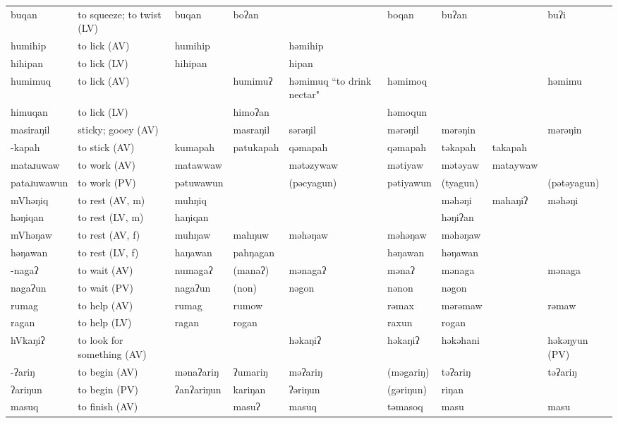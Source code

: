 \begin{landscape}
\begin{longtable}{*{9}{p{}}}
\text{*}buqan & to squeeze; to twist (LV) & buqan & boʔan &  & boqan & buʔan &  & buʔi\\
\text{*}humihip & to lick (AV) & humihip &  & həmihip &  &  &  & \\
\text{*}hihipan & to lick (LV) & hihipan &  & hipan &  &  &  & \\
\text{*}humimuq & to lick (AV) &  & humimuʔ & həmimuq ``to drink nectar" & həmimoq &  &  & həmimu\\
\text{*}himuqan & to lick (LV) &  & himoʔan &  & həmoqun &  &  & \\
\text{*}masiraŋil & sticky; gooey (AV) &  & masraŋil & sərəŋil & mərəŋil & mərəŋin &  & mərəŋin\\
\text{*}-kapah & to stick (AV) & kumapah & patukapah & qəmapah & qəmapah & təkapah & takapah & \\
\text{*}mataɹuwaw & to work (AV) & matawwaw &  & mətəzywaw & mətiyaw & mətəyaw & mataywaw & \\
\text{*}pataɹuwawun & to work (PV) & pətuwawun &  & (pəcyagun) & pətiyawun & (tyagun) &  & (pətəyagun)\\
\text{*}mVhəŋiq & to rest (AV, m) & muhŋiq &  &  &  & məhəŋi & mahaŋiʔ & məhəŋi\\
\text{*}həŋiqan & to rest (LV, m) & haŋiqan &  &  &  & həŋiʔan &  & \\
\text{*}mVhəŋaw & to rest (AV, f) & muhŋaw & mahŋuw & məhəŋaw & məhəŋaw & məhəŋaw &  & \\
\text{*}həŋawan & to rest (LV, f) & haŋawan & pahŋagan &  & həŋawan & həŋawan &  & \\
\text{*}-nagaʔ & to wait (AV) & numagaʔ & (manaʔ) & mənagaʔ & mənaʔ & mənaga &  & mənaga\\
\text{*}nagaʔun & to wait (PV) & nagaʔun & (non) & nəgon & nənon & nəgon &  & \\
\text{*}rumag & to help (AV) & rumag & rumow &  & rəmax & mərəmaw &  & rəmaw\\
\text{*}ragan & to help (LV) & ragan & rogan &  & raxun & rogan &  & \\
\text{*}hVkaŋiʔ & to look for something (AV) &  &  & həkaŋiʔ & həkaŋiʔ & həkəhani &  & həkəŋyun (PV)\\
\text{*}-ʔariŋ & to begin (AV) & mənaʔariŋ & ʔumariŋ & məʔariŋ & (məgariŋ) & təʔariŋ &  & təʔariŋ\\
\text{*}ʔariŋun & to begin (PV) & ʔanʔariŋun & kariŋan & ʔəriŋun & (gəriŋun) & riŋan &  & \\
\text{*}masuq & to finish (AV) &  & masuʔ & masuq & təmasoq & masu &  & masu\\

\end{longtable}
\end{landscape}
